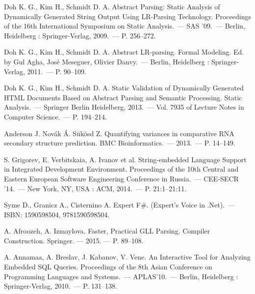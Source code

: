 \begin{thebibliography}{99}

  Doh K. G., Kim H., Schmidt D. A. 
  Abstract Parsing: Static Analysis of Dynamically Generated String Output Using LR-Parsing Technology. 
  Proceedings of the 16th International Symposium on Static Analysis.~--- SAS ’09.~--- Berlin, Heidelberg : Springer-Verlag, 2009.~--- P. 256–272.

  Doh K. G., Kim H., Schmidt D. A. 
  Abstract LR-parsing. 
  Formal Modeling. Ed. by Gul Agha, José Meseguer, Olivier Danvy.~--- Berlin, Heidelberg : Springer-Verlag, 2011.~--- P. 90–109.

  Doh K. G., Kim H., Schmidt D. A. 
  Static Validation of Dynamically Generated HTML Documents Based on Abstract Parsing and Semantic Processing.
  Static Analysis.~--- Springer Berlin Heidelberg, 2013.~--- Vol. 7935 of Lecture Notes in Computer Science.~--- P. 194–214.
                                                                                                                         
  Anderson J. Nov{\'a}k {\'A}. Sükösd Z. 
  Quantifying variances in comparative RNA secondary structure prediction.
  BMC Bioinformatics.~--- 2013.~--- P. 14–149. 

  S. Grigorev, E. Verbitskaia, A. Ivanov et al.
  String-embedded Language Support in Integrated Development Environment.
  Proceedings of the 10th Central and Eastern European Software Engineering Conference in Russia.~--- CEE-SECR ’14.~--- New York, NY, USA : ACM, 2014.~--- P. 21:1–21:11.

                                                                                                                                                          
  Syme D., Granicz A., Cisternino A. 
  Expert F\#.
  (Expert’s Voice in .Net).~--- ISBN: 1590598504, 9781590598504.

  A. Afroozeh, A. Izmaylova.
  Faster, Practical GLL Parsing.
  Compiler Construction. Springer. — 2015. — P. 89–108.                                                                                                   

  A. Annamaa, A. Breslav, J. Kabanov, V. Vene.
  An Interactive Tool for Analyzing Embedded SQL Queries.
  Proceedings of the 8th Asian Conference on Programming Languages and Systems.~--- APLAS’10.~--- Berlin, Heidelberg : Springer-Verlag, 2010.~--- P. 131–138.


\end{thebibliography}
